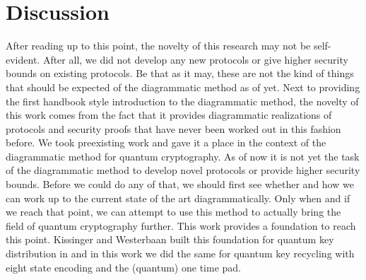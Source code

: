 \documentclass[]{article}
\begin{document}
\section{Discussion}
\label{section:discussion}




After reading up to this point, the novelty of this research may not be self-evident. After all, we did not develop any new protocols or give higher security bounds on existing protocols. Be that as it may, these are not the kind of things that should be expected of the diagrammatic method as of yet. Next to providing the first handbook style introduction to the diagrammatic method, the novelty of this work comes from the fact that it provides diagrammatic realizations of protocols and security proofs that have never been worked out in this fashion before. We took preexisting work and gave it a place in the context of the diagrammatic method for quantum cryptography. As of now it is not yet the task of the diagrammatic method to develop novel protocols or provide higher security bounds. Before we could do any of that, we should first see whether and how we can work up to the current state of the art diagrammatically. Only when and if we reach that point, we can attempt to use this method to actually bring the field of quantum cryptography further. This work provides a foundation to reach this point. Kissinger and Westerbaan built this foundation for quantum key distribution in \cite{Kissinger2017} and in this work we did the same for quantum key recycling with eight state encoding and the (quantum) one time pad.
\end{document}
